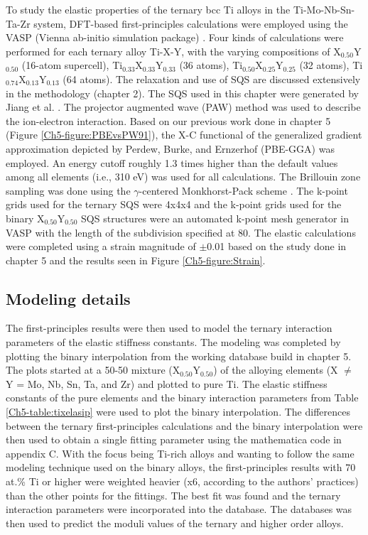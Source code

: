 To study the elastic properties of the ternary bcc Ti alloys in the Ti-Mo-Nb-Sn-Ta-Zr system, DFT-based first-principles calculations were employed using the VASP (Vienna ab-initio simulation package) \cite{Kresse1996,Kresse1999}. Four kinds of calculations were performed for each ternary alloy Ti-X-Y, with the varying compositions of X$_{0.50}$Y$_{0.50}$ (16-atom supercell), Ti$_{0.33}$X$_{0.33}$Y$_{0.33}$ (36 atoms), Ti$_{0.50}$X$_{0.25}$Y$_{0.25}$ (32 atoms), Ti$_{0.74}$X$_{0.13}$Y$_{0.13}$ (64 atoms). The relaxation and use of SQS are discussed extensively in the methodology (chapter 2). The SQS used in this chapter were generated by Jiang et al. \cite{Jiang2004,Jiang2009}. The projector augmented wave (PAW) method was used to describe the ion-electron interaction. Based on our previous work done in chapter 5 (Figure \ref{Ch5-figure:PBEvsPW91}), the X-C functional of the generalized gradient approximation depicted by Perdew, Burke, and Ernzerhof (PBE-GGA) \cite{Perdew1996a} was employed. An energy cutoff roughly 1.3 times higher than the default values among all elements (i.e., 310 eV) was used for all calculations. The Brillouin zone sampling was done using the $\gamma$-centered Monkhorst-Pack scheme \cite{Monkhorst1976a}. The k-point grids used for the ternary SQS were 4x4x4 and the k-point grids used for the binary X$_{0.50}$Y$_{0.50}$ SQS structures were an automated k-point mesh generator in VASP with the length of the subdivision specified at 80. The elastic calculations were completed using a strain magnitude of $\pm$0.01 based on the study done in chapter 5 and the results seen in Figure \ref{Ch5-figure:Strain}.

\subsection{Modeling details}

The first-principles results were then used to model the ternary interaction parameters of the elastic stiffness constants. The modeling was completed by plotting the binary interpolation from the working database build in chapter 5. The plots started at a 50-50 mixture (X$_{0.50}$Y$_{0.50}$) of the alloying elements (X $\neq$ Y = Mo, Nb, Sn, Ta, and Zr) and plotted to pure Ti. The elastic stiffness constants of the pure elements and the binary interaction parameters from Table \ref{Ch5-table:tixelasip} were used to plot the binary interpolation. The differences between the ternary first-principles calculations and the binary interpolation were then used to obtain a single fitting parameter using the mathematica code in appendix C. With the focus being Ti-rich alloys and wanting to follow the same modeling technique used on the binary alloys, the first-principles results with 70 at.\% Ti or higher were weighted heavier (x6, according to the authors' practices) than the other points for the fittings. The best fit was found and the ternary interaction parameters were incorporated into the database. The databases was then used to predict the moduli values of the ternary and higher order alloys. 

